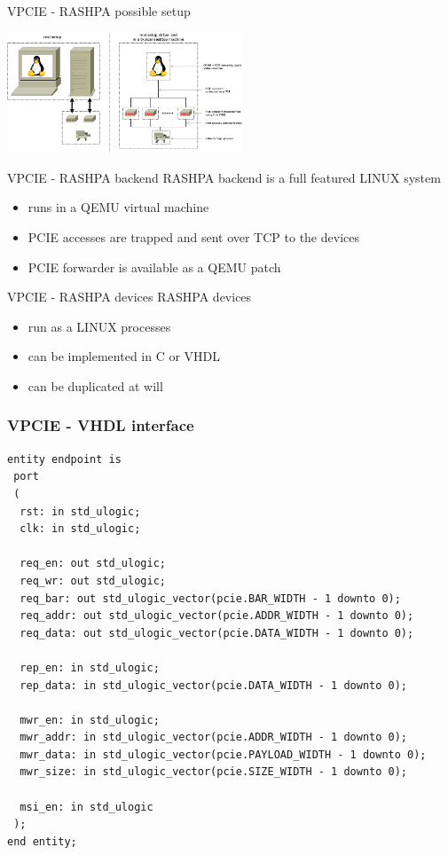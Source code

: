 \documentclass{beamer}
\begin{document}
\begin{frame}{VPCIE - RASHPA possible setup}
  \begin{center}
  \includegraphics[width=70mm]{pic/dv_vpcie/main.jpeg}
  \end{center}
\end{frame}

\begin{frame}{VPCIE - RASHPA backend}
  RASHPA backend is a full featured LINUX system
  \begin{itemize}
  \item runs in a QEMU virtual machine
  \item PCIE accesses are trapped and sent over TCP to the devices
  \item PCIE forwarder is available as a QEMU patch
  \end{itemize}
\end{frame}

\begin{frame}{VPCIE - RASHPA devices}
  RASHPA devices
  \begin{itemize}
  \item run as a LINUX processes
  \item can be implemented in C or VHDL
  \item can be duplicated at will
  \end{itemize}
\end{frame}

\begin{frame}[containsverbatim]
 \frametitle{VPCIE - VHDL interface}
 \begin{tiny}
 \lstset{language=VHDL}
 \begin{lstlisting}[frame=tb]
entity endpoint is
 port
 (
  rst: in std_ulogic;
  clk: in std_ulogic;

  req_en: out std_ulogic;
  req_wr: out std_ulogic;
  req_bar: out std_ulogic_vector(pcie.BAR_WIDTH - 1 downto 0);
  req_addr: out std_ulogic_vector(pcie.ADDR_WIDTH - 1 downto 0);
  req_data: out std_ulogic_vector(pcie.DATA_WIDTH - 1 downto 0);

  rep_en: in std_ulogic;
  rep_data: in std_ulogic_vector(pcie.DATA_WIDTH - 1 downto 0);

  mwr_en: in std_ulogic;
  mwr_addr: in std_ulogic_vector(pcie.ADDR_WIDTH - 1 downto 0);
  mwr_data: in std_ulogic_vector(pcie.PAYLOAD_WIDTH - 1 downto 0);
  mwr_size: in std_ulogic_vector(pcie.SIZE_WIDTH - 1 downto 0);

  msi_en: in std_ulogic
 );
end entity;
 \end{lstlisting}
 \end{tiny}
\end{frame}
\end{document}
